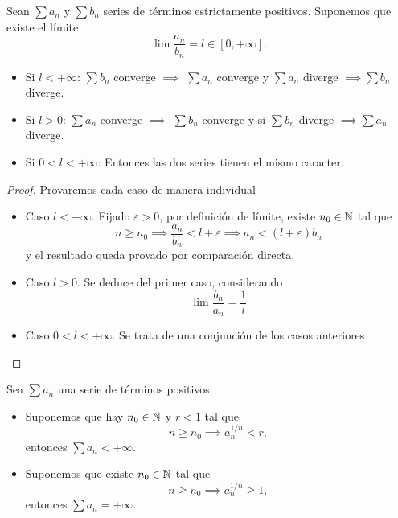 \begin{prop}
    Sean $\sum a_n$ y $\sum b_n$ series de términos estrictamente positivos.
    Suponemos que existe el límite
    \[
        \lim \frac{a_n}{b_n} = l \in [0,+\infty].
    \]
    \begin{itemize}
        \item Si $l < + \infty$: $\sum b_n$ converge $\implies$ $\sum a_n$ converge y
            $\sum a_n$ diverge $\implies \sum b_n$ diverge.
        \item Si $l > 0$: $\sum a_n$ converge $\implies$ $\sum b_n$ converge y si $\sum b_n$
            diverge $\implies \sum a_n$ diverge.
        \item Si $0 < l < +\infty$: Entonces las dos series tienen el mismo caracter.
    \end{itemize}
\end{prop}
\begin{proof}
    Provaremos cada caso de manera individual
    \begin{itemize}
        \item Caso $l < +\infty$. Fijado $\varepsilon > 0$, por definición de límite, existe
        $n_0\in\mathbb{N}$ tal que
        \[
            n \geq n_0 \implies \frac{a_n}{b_n} < l + \varepsilon \implies
            a_n < (l+\varepsilon)b_n
        \]
        y el resultado queda provado por comparación directa.
        \item Caso $l > 0$. Se deduce del primer caso, considerando
        \[
            \lim \frac{b_n}{a_n} = \frac{1}{l}
        \]
        \item Caso $0 < l < +\infty$. Se trata de una conjunción de los casos
        anteriores
    \end{itemize}
\end{proof}

\begin{lema}
    Sea $\sum a_n$ una serie de términos positivos.
    \begin{itemize}
        \item Suponemos que hay $n_0 \in \mathbb{N}$ y $r < 1$ tal que
        \[
            n \geq n_0 \implies a_n^{1/n} < r,
        \]
        entonces $\sum a_n < +\infty$.
        \item Suponemos que existe $n_0 \in \mathbb{N}$ tal que
        \[
            n \geq n_0 \implies a_n^{1/n} \geq 1,
        \]
        entonces $\sum a_n = +\infty$.
    \end{itemize}
\end{lema}

